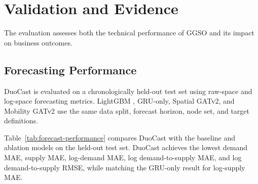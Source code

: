 \documentclass[a4paper,10pt,twocolumn]{article}
\begin{document}
\section{Validation and Evidence}
\label{sec:validation}
The evaluation assesses both the technical performance of GGSO and its
impact on business outcomes.

\subsection{Forecasting Performance}
DuoCast is evaluated on a chronologically held-out test set using raw-space
and log-space forecasting metrics. LightGBM \cite{ke2017}, GRU-only,
Spatial GATv2, and Mobility GATv2 use the same data split, forecast horizon,
node set, and target definitions.


\begin{table}[H]
\centering
\caption{Forecasting performance on the held-out test set.}
\label{tab:forecast-performance}
\footnotesize
\setlength{\tabcolsep}{3pt}
\end{table}



Table~\ref{tab:forecast-performance} compares DuoCast with
the baseline and ablation models on the held-out test set.
DuoCast achieves the lowest demand MAE, supply MAE, log-demand MAE,
log demand-to-supply MAE, and log demand-to-supply RMSE, while matching
the GRU-only result for log-supply MAE.
\end{document}
